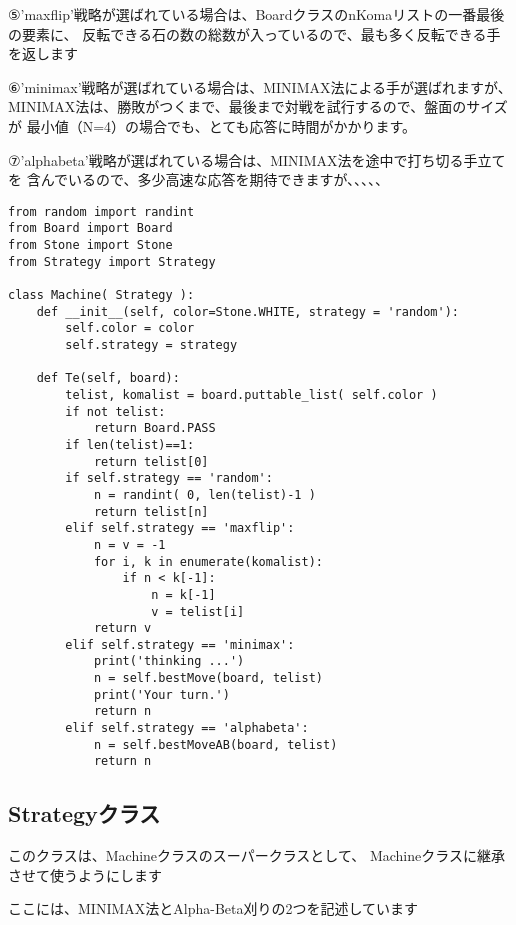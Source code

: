 \documentclass[uplatex,a4paper,11pt,oneside,openany]{jsbook}
\begin{document}
⑤'maxflip'戦略が選ばれている場合は、BoardクラスのnKomaリストの一番最後の要素に、
反転できる石の数の総数が入っているので、最も多く反転できる手を返します

⑥'minimax'戦略が選ばれている場合は、MINIMAX法による手が選ばれますが、
MINIMAX法は、勝敗がつくまで、最後まで対戦を試行するので、盤面のサイズが
最小値（N=4）の場合でも、とても応答に時間がかかります。

⑦'alphabeta'戦略が選ばれている場合は、MINIMAX法を途中で打ち切る手立てを
含んでいるので、多少高速な応答を期待できますが、、、、、

\begin{lstlisting}[caption=Machine class,label=othello02]
from random import randint
from Board import Board
from Stone import Stone
from Strategy import Strategy

class Machine( Strategy ):
    def __init__(self, color=Stone.WHITE, strategy = 'random'):
        self.color = color
        self.strategy = strategy

    def Te(self, board):
        telist, komalist = board.puttable_list( self.color )
        if not telist:
            return Board.PASS
        if len(telist)==1:
            return telist[0]
        if self.strategy == 'random':
            n = randint( 0, len(telist)-1 )
            return telist[n]
        elif self.strategy == 'maxflip':
            n = v = -1
            for i, k in enumerate(komalist):
                if n < k[-1]:
                    n = k[-1]
                    v = telist[i]
            return v
        elif self.strategy == 'minimax':
            print('thinking ...')
            n = self.bestMove(board, telist)
            print('Your turn.')
            return n
        elif self.strategy == 'alphabeta':
            n = self.bestMoveAB(board, telist)
            return n
\end{lstlisting}

\subsection{Strategyクラス}

このクラスは、Machineクラスのスーパークラスとして、
Machineクラスに継承させて使うようにします

ここには、MINIMAX法とAlpha-Beta刈りの2つを記述しています
\end{document}
